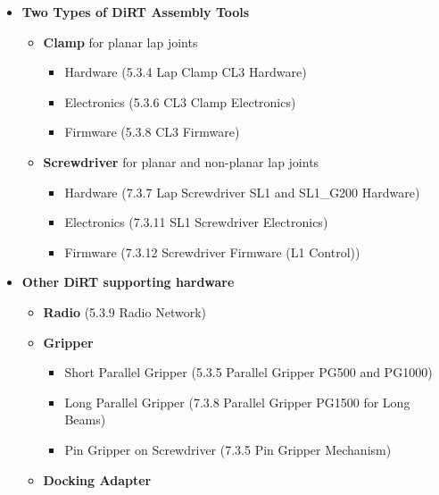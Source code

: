 \documentclass[11pt]{book}
\begin{document}
\begin{itemize}
\begin{itemize}
\end{itemize}
	\item \textbf{Two Types of DiRT Assembly Tools}

\begin{itemize}
	\item \textbf{Clamp }for planar lap joints

\begin{itemize}
	\item Hardware (5.3.4 Lap Clamp CL3 Hardware)

	\item Electronics (5.3.6 CL3 Clamp Electronics)

	\item Firmware (5.3.8 CL3 Firmware)

\end{itemize}
	\item \textbf{Screwdriver }for planar and non-planar lap joints 

\begin{itemize}
	\item Hardware (7.3.7 Lap Screwdriver SL1 and SL1\_G200 Hardware)

	\item Electronics (7.3.11 SL1 Screwdriver Electronics)

	\item Firmware (7.3.12 Screwdriver Firmware (L1 Control))

\end{itemize}
\end{itemize}
	\item \textbf{Other DiRT supporting hardware}

\begin{itemize}
	\item \textbf{Radio }(5.3.9 Radio Network)

	\item \textbf{Gripper }

\begin{itemize}
	\item Short Parallel Gripper (5.3.5 Parallel Gripper PG500 and PG1000)

	\item Long Parallel Gripper (7.3.8 Parallel Gripper PG1500 for Long Beams)

	\item Pin Gripper on Screwdriver (7.3.5 Pin Gripper Mechanism)

\end{itemize}
	\item \textbf{Docking Adapter}


\end{itemize}
\end{itemize}
\end{document}
